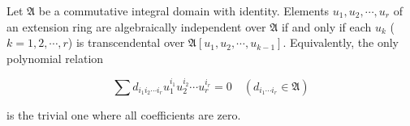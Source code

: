 Let $\mathfrak{A}$ be a commutative integral domain with identity. Elements $u_1, u_2, \cdots, u_r$ of an extension ring are algebraically independent over $\mathfrak{A}$ if and only if each $u_k$ ($k = 1, 2, \cdots, r$) is transcendental over $\mathfrak{A}[u_1, u_2, \cdots, u_{k-1}]$. Equivalently, the only polynomial relation

$$\sum d_{i_1 i_2 \cdots i_r} u_1^{i_1} u_2^{i_2} \cdots u_r^{i_r} = 0 \quad (d_{i_1 \cdots i_r} \in \mathfrak{A})$$

is the trivial one where all coefficients are zero.
